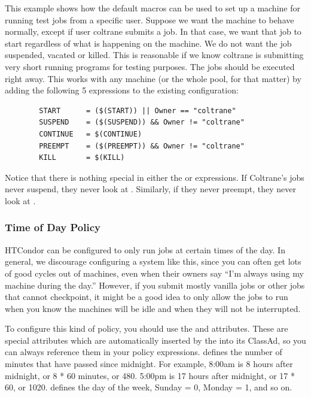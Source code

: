 This example shows how the default macros can be used to
set up a machine for running test jobs from a specific user.
Suppose we want the machine to
behave normally, except if user coltrane submits a job.
In that case, we
want that job to start regardless of what is happening on the machine.
We do not want the job suspended, vacated or killed.
This is reasonable if 
we know coltrane is submitting very short
running programs for testing purposes. 
The jobs should be executed right away.
This works with any machine
(or the whole pool, for that matter) by adding the following 5 expressions
to the existing configuration:
\begin{verbatim}
        START      = ($(START)) || Owner == "coltrane"
        SUSPEND    = ($(SUSPEND)) && Owner != "coltrane"
        CONTINUE   = $(CONTINUE)
        PREEMPT    = ($(PREEMPT)) && Owner != "coltrane"
        KILL       = $(KILL)
\end{verbatim}
Notice that there is nothing special in either the
 or  expressions.
If Coltrane's jobs never suspend, they never look at .  
Similarly, if they never preempt, they never look at . 


\subsubsection{\label{sec:Time of Day Policy}
Time of Day Policy}

HTCondor can be
configured to only run jobs at
certain times of the day.
In general, we discourage configuring a system like this, since you
can often get lots of good cycles out of machines, even when their
owners say ``I'm always using my machine during the day.''
However, if you submit mostly vanilla jobs or other jobs that cannot
checkpoint, it might be a good idea to only allow the jobs to run when
you know the machines will be idle and when they will not be
interrupted.

To configure this kind of policy, you should use the 
and  attributes.
These are special attributes which are automatically inserted by the
 into its ClassAd, so you can always reference them in
your policy expressions.
 defines the number of minutes that have passed since
midnight.  
For example, 8:00am is 8 hours after midnight, or 8 * 60 minutes, or
480.
5:00pm is 17 hours after midnight, or 17 * 60, or 1020.
 defines the day of the week, Sunday = 0, Monday = 1,
and so on.  

